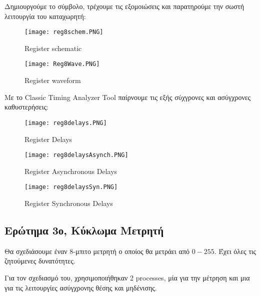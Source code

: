 \documentclass{article}
\begin{document}
Δημιουργούμε το σύμβολο, τρέχουμε τις εξομοιώσεις και παρατηρούμε την σωστή λειτουργία του καταχωρητή:

\begin{figure}[h!]
  \caption{\foreignlanguage{english}{Register schematic}}
\texttt{[image: reg8schem.PNG]} 
\end{figure}


\begin{figure}[h!]
  \caption{\foreignlanguage{english}{Register waveform}}
\texttt{[image: Reg8Wave.PNG]}
\end{figure}

\clearpage


Με το \foreignlanguage{english}{Classic Timing Analyzer Tool} παίρνουμε τις εξής σύχγρονες και ασύγχρονες καθυστερήσεις:


\begin{figure}[h!]
  \caption{\foreignlanguage{english}{Register Delays}}
\texttt{[image: reg8delays.PNG]} 
\end{figure}


\begin{figure}[h!]
  \caption{\foreignlanguage{english}{Register Asynchronous Delays}}
\texttt{[image: reg8delaysAsynch.PNG]} 
\end{figure}

\begin{figure}[h!]
  \caption{\foreignlanguage{english}{Register Synchronous Delays}}
\texttt{[image: reg8delaysSyn.PNG]} 
\end{figure}

\clearpage

\subsection{Ερώτημα 3ο, Κύκλωμα Μετρητή}

Θα σχεδιάσουμε έναν 8-μπιτο μετρητή ο οποίος θα μετράει από $0-255$. Έχει όλες τις ζητούμενες δυνατότητες.

Για τον σχεδιασμό του, χρησιμοποιήθηκαν 2 \foreignlanguage{english}{processes}, μία για την μέτρηση και μια για τις λειτουργίες ασύγχρονης θέσης και μηδένισης.
\end{document}
